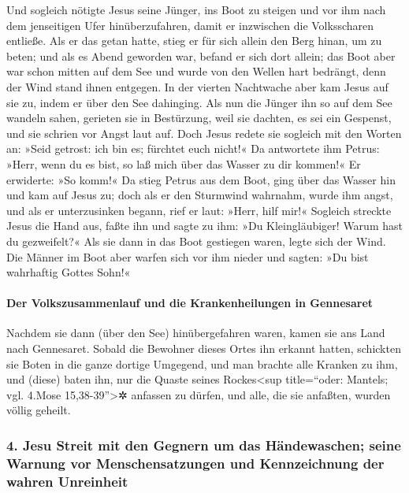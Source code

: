  Und sogleich nötigte Jesus seine Jünger, ins Boot zu
steigen und vor ihm nach dem jenseitigen Ufer hinüberzufahren, damit er
inzwischen die Volksscharen entließe.  Als er das getan
hatte, stieg er für sich allein den Berg hinan, um zu beten; und als es
Abend geworden war, befand er sich dort allein;  das Boot
aber war schon mitten auf dem See und wurde von den Wellen hart
bedrängt, denn der Wind stand ihnen entgegen.  In der
vierten Nachtwache aber kam Jesus auf sie zu, indem er über den See
dahinging.  Als nun die Jünger ihn so auf dem See wandeln
sahen, gerieten sie in Bestürzung, weil sie dachten, es sei ein
Gespenst, und sie schrien vor Angst laut auf.  Doch Jesus
redete sie sogleich mit den Worten an: »Seid getrost: ich bin es;
fürchtet euch nicht!«  Da antwortete ihm Petrus: »Herr,
wenn du es bist, so laß mich über das Wasser zu dir kommen!«
 Er erwiderte: »So komm!« Da stieg Petrus aus dem Boot,
ging über das Wasser hin und kam auf Jesus zu;  doch als
er den Sturmwind wahrnahm, wurde ihm angst, und als er unterzusinken
begann, rief er laut: »Herr, hilf mir!«  Sogleich
streckte Jesus die Hand aus, faßte ihn und sagte zu ihm: »Du
Kleingläubiger! Warum hast du gezweifelt?«  Als sie dann
in das Boot gestiegen waren, legte sich der Wind.  Die
Männer im Boot aber warfen sich vor ihm nieder und sagten: »Du bist
wahrhaftig Gottes Sohn!«

\hypertarget{der-volkszusammenlauf-und-die-krankenheilungen-in-gennesaret}{%
\paragraph{Der Volkszusammenlauf und die Krankenheilungen in
Gennesaret}\label{der-volkszusammenlauf-und-die-krankenheilungen-in-gennesaret}}

 Nachdem sie dann (über den See) hinübergefahren waren,
kamen sie ans Land nach Gennesaret.  Sobald die Bewohner
dieses Ortes ihn erkannt hatten, schickten sie Boten in die ganze
dortige Umgegend, und man brachte alle Kranken zu ihm, 
und (diese) baten ihn, nur die Quaste seines Rockes\textless sup
title=``oder: Mantels; vgl. 4.Mose 15,38-39''\textgreater✲ anfassen zu
dürfen, und alle, die sie anfaßten, wurden völlig geheilt.

\hypertarget{jesu-streit-mit-den-gegnern-um-das-huxe4ndewaschen-seine-warnung-vor-menschensatzungen-und-kennzeichnung-der-wahren-unreinheit}{%
\subsubsection{4. Jesu Streit mit den Gegnern um das Händewaschen; seine
Warnung vor Menschensatzungen und Kennzeichnung der wahren
Unreinheit}\label{jesu-streit-mit-den-gegnern-um-das-huxe4ndewaschen-seine-warnung-vor-menschensatzungen-und-kennzeichnung-der-wahren-unreinheit}}

